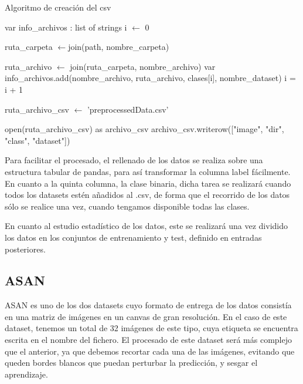 \begin{algorithm}[H]
		 \label{isiccrear}
		\caption{Algoritmo de creación del csv}
		\begin{algorithmic}[1]
			
		 \State var info\_archivos : list of strings
		 \State i  $\gets$ 0
		
			\State ruta\_carpeta $\gets$join(path, nombre\_carpeta)
			
		
						  \State ruta\_archivo $\gets$ join(ruta\_carpeta, nombre\_archivo)
						\State var info\_archivos.add(nombre\_archivo, ruta\_archivo, clases[i], nombre\_dataset)
					\EndIf
					\State i = i + 1
				\EndFor
		 	\EndIf
		\EndFor		
		
	
		\State ruta\_archivo\_csv $\gets$ 'preprocessedData.csv'	
		
		\State open(ruta\_archivo\_csv) as archivo\_csv
		 \State archivo\_csv.writerow(["image", "dir", "class", "dataset"])  
		 
		 \EndProcedure
	\end{algorithmic}
\end{algorithm}

Para facilitar el procesado, el rellenado de los datos se realiza sobre una estructura tabular de pandas, para así transformar la columna label fácilmente.
En cuanto a la quinta columna, la clase binaria, dicha tarea se realizará cuando todos los datasets estén añadidos al .csv, de forma que el recorrido de los datos sólo se realice una vez, cuando tengamos disponible todas las clases. 

En cuanto al estudio estadístico de los datos, este se realizará una vez dividido los datos en los conjuntos de entrenamiento y test, definido en entradas posteriores.

\subsection{ASAN}

ASAN es uno de los dos datasets cuyo formato de entrega de los datos consistía en una matriz de imágenes en un canvas de gran resolución. En el caso de este dataset, tenemos un total de 32 imágenes de este tipo, cuya etiqueta se encuentra escrita en el nombre del fichero.
El procesado de este dataset será más complejo que el anterior, ya que debemos recortar cada una de las imágenes, evitando que queden bordes blancos que puedan perturbar la predicción, y sesgar el aprendizaje.

